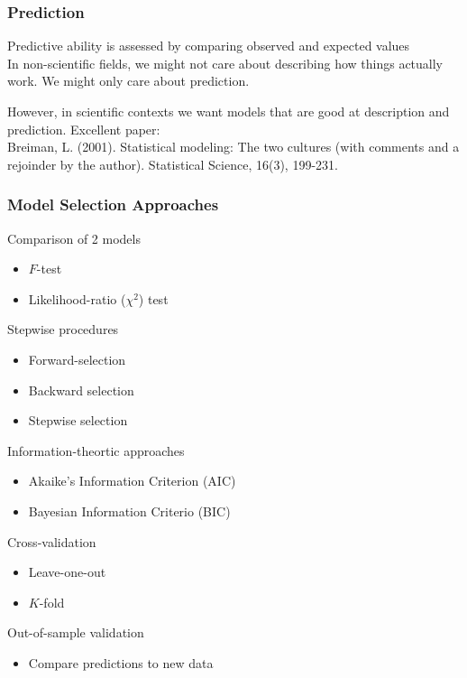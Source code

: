 \documentclass[color=usenames,dvipsnames]{beamer}\usepackage[]{graphicx}\usepackage[]{color}
\begin{document}
\begin{frame}
  \frametitle{Prediction}
  \large
  Predictive ability is assessed by comparing observed and expected
  values \\ 
  \pause
  \vfill
  In non-scientific fields, we might not care about describing how
  things actually work. We might only care about prediction. \par
  \pause
  \vfill
  However, in scientific contexts we want models that are good at
  description and prediction.
  \pause
  \vfill
  Excellent paper: \\
  \normalsize
  Breiman, L. (2001). Statistical modeling: The two cultures (with
  comments and a rejoinder by the author). Statistical Science, 16(3),
  199-231. \\
\end{frame}




\begin{frame}
  \frametitle{Model Selection Approaches}
  Comparison of 2 models
  \begin{itemize}
    \item $F$-test
    \item Likelihood-ratio ($\chi^2$) test
  \end{itemize}
  \pause
  Stepwise procedures
  \begin{itemize}
    \item Forward-selection
    \item Backward selection
    \item Stepwise selection
  \end{itemize}
  \pause
  Information-theortic approaches
  \begin{itemize}
    \item Akaike's Information Criterion (AIC)
    \item Bayesian Information Criterio (BIC)
  \end{itemize}
  \pause
  Cross-validation
  \begin{itemize}
    \item Leave-one-out
    \item $K$-fold %
  \end{itemize}
  \pause
  Out-of-sample validation
  \begin{itemize}
    \item Compare predictions to new data
  \end{itemize}
\end{frame}
\end{document}
